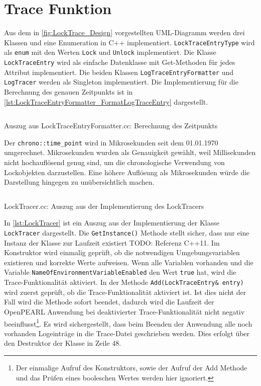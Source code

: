 \section{Trace Funktion}
\label{section:Implementierung:Trace Funktion}
Aus dem in \cref{fig:LockTrace_Design} vorgestellten UML-Diagramm werden drei
Klassen und eine Enumeration in C++ implementiert.
\texttt{Lock\-Trace\-Entry\-Type} wird als \texttt{enum} mit den Werten
\texttt{Lock} und \texttt{Unlock} implementiert. Die Klasse
\texttt{LockTraceEntry} wird als einfache Datenklasse mit Get-Methoden für jedes
Attribut implementiert. Die beiden Klassen \texttt{Log\-Trace\-Entry\-Formatter}
und \texttt{LogTracer} werden als Singleton implementiert. Die Implementierung
für die Berechnung des genauen Zeitpunkts ist in
\cref{lst:LockTraceEntryFormatter_FormatLogTraceEntry} dargestellt.

\begin{listing}[ht]
  \inputminted[frame=lines,linenos,firstline=31,lastline=33]{cpp}{./cpp/LockTraceEntryFormatter.cc}
  \caption{Auszug aus LockTraceEntryFormatter.cc: Berechnung des Zeitpunkts}
  \label{lst:LockTraceEntryFormatter_FormatLogTraceEntry}   
\end{listing}

Der \texttt{chrono::time\_point} wird in Mikrosekunden seit dem 01.01.1970
umgerechnet. Mikrosekunden wurden als Genauigkeit gewählt, weil Millisekunden
nicht hochauflösend genug sind, um die chronologische Verwendung von
Lockobjekten darzustellen. Eine höhere Auflösung als Mikrosekunden würde die
Darstellung hingegen zu unübersichtlich machen.

\begin{listing}[ht]
  \inputminted[frame=lines,linenos,firstline=11,lastline=54]{cpp}{./cpp/LockTracer.cc}
  \caption{LockTracer.cc: Auszug aus der Implementierung des LockTracers}
  \label{lst:LockTracer}
\end{listing}

In \cref{lst:LockTracer} ist ein Auszug aus der Implementierung der Klasse
\texttt{LockTracer} dargestellt. Die \texttt{GetInstance()} Methode stellt
sicher, dass nur eine Instanz der Klasse zur Laufzeit existiert TODO: Referenz
C++11. Im Konstruktor wird einmalig geprüft, ob die notwendigen
Umgebungsvariablen existieren und korrekte Werte aufweisen. Wenn alle Variablen
vorhanden und die Variable \texttt{Name\-Of\-Environment\-Variable\-Enabled} den
Wert \texttt{true} hat, wird die Trace-Funktionalität aktiviert. In der Methode
\texttt{Add(Lock\-Trace\-Entry\& entry)} wird zuerst geprüft, ob die
Trace-Funktionalität aktiviert ist. Ist dies nicht der Fall wird die Methode
sofort beendet, dadurch wird die Laufzeit der OpenPEARL Anwendung bei
deaktivierter Trace-Funktionalität nicht negativ beeinflusst\footnote{Der
einmalige Aufruf des Konstruktors, sowie der Aufruf der Add Methode
und das Prüfen eines booleschen Wertes werden hier ignoriert.}. Es wird
sichergestellt, dass beim Beenden der Anwendung alle noch vorhanden Logeinträge
in die Trace-Datei geschrieben werden. Dies erfolgt über den Destruktor der
Klasse in Zeile 48.

